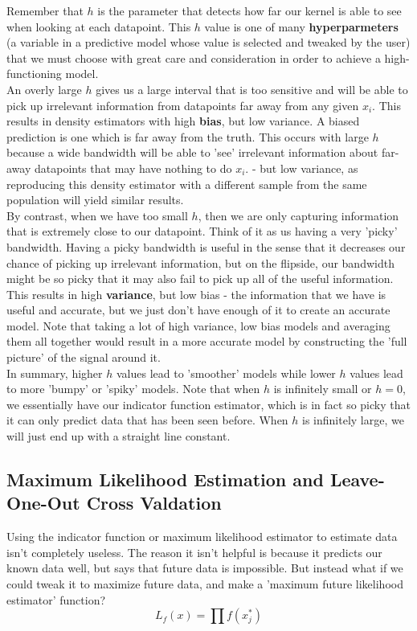 \documentclass[12pt]{article}
\begin{document}
Remember that $h$ is the parameter that detects how far our kernel is able to see when looking at each datapoint. This $h$ value is one of many \textbf{hyperparmeters} (a variable in a predictive model whose value is selected and tweaked by the user) that we must choose with great care and consideration in order to achieve a high-functioning model. \\

An overly large $h$ gives us a large interval that is too sensitive and will be able to pick up irrelevant information from datapoints far away from any given $x_i$. This results in density estimators with high \textbf{bias}, but low variance. A biased prediction is one which is far away from the truth. This occurs with large $h$ because a wide bandwidth will be able to 'see' irrelevant information about far-away datapoints that may have nothing to do $x_i$. - but low variance, as reproducing this density estimator with a different sample from the same population will yield similar results. \\

By contrast, when we have too small $h$, then we are only capturing information that is extremely close to our datapoint. Think of it as us having a very 'picky' bandwidth. Having a picky bandwidth is useful in the sense that it decreases our chance of picking up irrelevant information, but on the flipside, our bandwidth might be so picky that it may also fail to pick up all of the useful information. This results in high \textbf{variance}, but low bias - the information that we have is useful and accurate, but we just don't have enough of it to create an accurate model. Note that taking a lot of high variance, low bias models and averaging them all together would result in a more accurate model by constructing the 'full picture' of the signal around it. \\

In summary, higher $h$ values lead to 'smoother' models while lower $h$ values lead to more 'bumpy' or 'spiky' models. Note that when $h$ is infinitely small or $h = 0$, we essentially have our indicator function estimator, which is in fact so picky that it can only predict data that has been seen before. When $h$ is infinitely large, we will just end up with a straight line constant. 
\subsection{Maximum Likelihood Estimation and Leave-One-Out Cross Valdation}
Using the indicator function or maximum likelihood estimator to estimate data isn't completely useless. The reason it isn't helpful is because it predicts our known data well, but says that future data is impossible. But instead what if we could tweak it to maximize future data, and make a 'maximum future likelihood estimator' function?
$$L_f(x) = \prod f(x^*_j)$$ 
\end{document}
